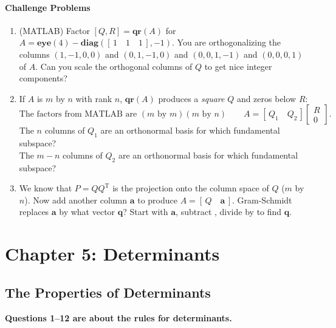 \documentclass[14pt, a4paper]{article}
\begin{document}
\paragraph{Challenge Problems}
\begin{enumerate}[resume]
    \item (\textcolor{blue!60!white}{MATLAB}) Factor $[Q, R] = \textbf{qr}(A)$ for $A = \textbf{eye}(4) - \textbf{diag}([\, 1 \quad 1 \quad 1 \,], -1)$. You are orthogonalizing the columns $(1, -1, 0, 0)$ and $(0, 1, -1, 0)$ and $(0, 0, 1, -1)$ and $(0, 0, 0, 1)$ of $A$. Can you scale the orthogonal columns of $Q$ to get nice integer components?

    \item If $A$ is $m$ by $n$ with rank $n$, $\textbf{qr}(A)$ produces a \emph{square} $Q$ and zeros below $R$:
          \[
              \text{The factors from MATLAB are } (m \text{ by } m)(m \text{ by } n) \qquad A = [\, Q_1 \quad Q_2 \,] \begin{bmatrix} R \\ 0 \end{bmatrix}.
          \]
          The $n$ columns of $Q_1$ are an orthonormal basis for which fundamental subspace? \\
          The $m-n$ columns of $Q_2$ are an orthonormal basis for which fundamental subspace?

    \item We know that $P = QQ^{\mathrm{T}}$ is the projection onto the column space of $Q$ ($m$ by $n$). Now add another column $\boldsymbol{a}$ to produce $A = [\, Q \quad \boldsymbol{a} \,]$. Gram-Schmidt replaces $\boldsymbol{a}$ by what vector $\boldsymbol{q}$? Start with $\boldsymbol{a}$, subtract \underline{\hspace{1.5cm}}, divide by \underline{\hspace{1.5cm}} to find $\boldsymbol{q}$.
\end{enumerate}


\newpage

\section{Chapter 5: Determinants}
\subsection{The Properties of Determinants}
\noindent \textbf{Questions 1--12 are about the rules for determinants.}
\end{document}

